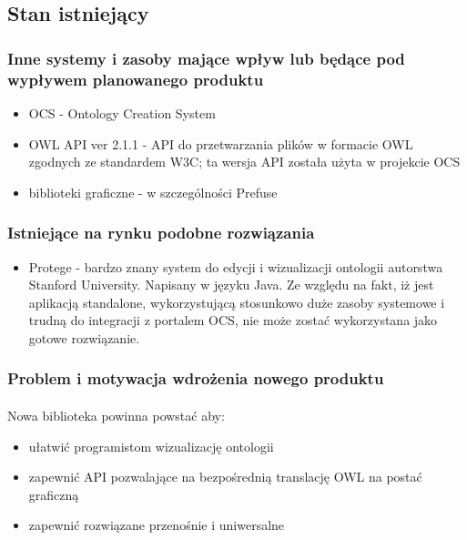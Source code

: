 \subsection{Stan istniejący}

\subsubsection{Inne systemy i zasoby mające wpływ lub będące pod wypływem planowanego produktu}

\begin{itemize}
 	\item OCS - Ontology Creation System
	\item OWL API ver 2.1.1 - API do przetwarzania plików w formacie OWL zgodnych ze standardem W3C; ta wersja API została użyta w projekcie OCS
	\item biblioteki graficzne - w szczególności Prefuse
\end{itemize}


\subsubsection{Istniejące na rynku podobne rozwiązania}

\begin{itemize}
 \item Protege - bardzo znany system do edycji i wizualizacji ontologii autorstwa Stanford University. Napisany w języku Java. Ze względu na fakt, iż jest aplikacją standalone, wykorzystującą stosunkowo duże zasoby systemowe i trudną do integracji z portalem OCS, nie może zostać wykorzystana jako gotowe rozwiązanie.

\end{itemize}

\subsubsection{Problem i motywacja wdrożenia nowego produktu}
\paragraph{} Nowa biblioteka powinna powstać aby:
\begin{itemize}
 \item ułatwić programistom wizualizację ontologii
\item zapewnić API pozwalające na bezpośrednią translację OWL na postać graficzną
\item zapewnić rozwiązane przenośnie i uniwersalne
\end{itemize}



